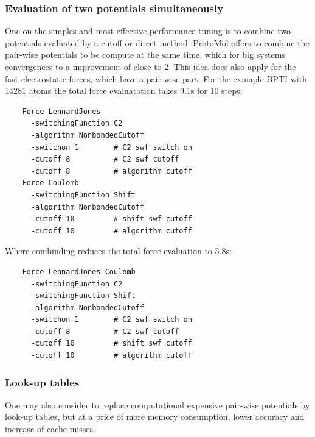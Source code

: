 \documentclass[11pt]{article}
\begin{document}

\subsubsection{Evaluation of two potentials simultaneously}

One on the simples and most effective performance tuning is to combine two
potentials evaluated by a cutoff or direct method. {\sc ProtoMol} offers 
to combine the pair-wise potentials to be compute at the same time, which for big
systems convergences to a improvement of close to 2. This idea does also
apply for the fast electrostatic forces, which have a pair-wise
part. For the exmaple BPTI with 14281 atoms the total force evaluatation
takes 9.1s for 10 steps:
\begin{verbatim}
    Force LennardJones 
      -switchingFunction C2 
      -algorithm NonbondedCutoff
      -switchon 1        # C2 swf switch on
      -cutoff 8          # C2 swf cutoff
      -cutoff 8          # algorithm cutoff
    Force Coulomb 
      -switchingFunction Shift 
      -algorithm NonbondedCutoff
      -cutoff 10         # shift swf cutoff
      -cutoff 10         # algorithm cutoff
\end{verbatim}
Where combinding reduces the total force evaluation to 5.8s:
\begin{verbatim}
    Force LennardJones Coulomb 
      -switchingFunction C2 
      -switchingFunction Shift 
      -algorithm NonbondedCutoff
      -switchon 1        # C2 swf switch on
      -cutoff 8          # C2 swf cutoff
      -cutoff 10         # shift swf cutoff
      -cutoff 10         # algorithm cutoff
\end{verbatim}

\subsubsection{Look-up tables}

One may also consider to replace computational expensive pair-wise
potentials by look-up tables, but at a price of more memory
consumption, lower accuracy and increase of cache misses. 
\end{document}
